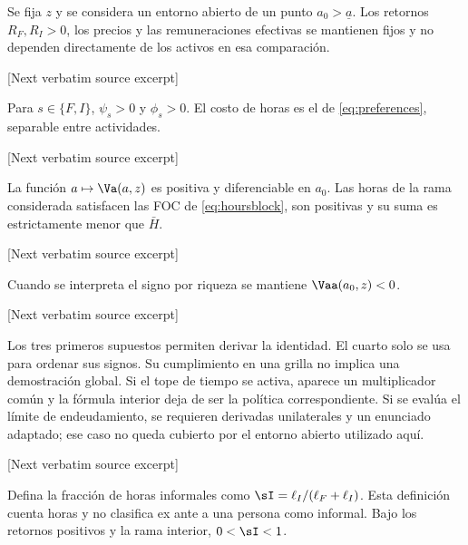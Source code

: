\documentclass[10pt]{article}
\begin{document}
\begin{ReviewVerbatim}

\begin{assumption}\label{ass:fixed}
Se fija \(z\) y se considera un entorno abierto de un punto \(a_0>\underline a\). Los retornos \(R_F,R_I>0\), los precios y las remuneraciones efectivas se mantienen fijos y no dependen directamente de los activos en esa comparación.
\end{assumption}

[Next verbatim source excerpt]

\begin{assumption}\label{ass:parameters}
Para \(s\in\{F,I\}\), \(\psi_s>0\) y \(\phi_s>0\). El costo de horas es el de \eqref{eq:preferences}, separable entre actividades.
\end{assumption}

[Next verbatim source excerpt]

\begin{assumption}\label{ass:regular}
La función \(a\mapsto\Va(a,z)\) es positiva y diferenciable en \(a_0\). Las horas de la rama considerada satisfacen las FOC de \eqref{eq:hoursblock}, son positivas y su suma es estrictamente menor que \(\bar H\).
\end{assumption}

[Next verbatim source excerpt]

\begin{assumption}\label{ass:concavity}
Cuando se interpreta el signo por riqueza se mantiene \(\Vaa(a_0,z)<0\).
\end{assumption}

[Next verbatim source excerpt]

Los tres primeros supuestos permiten derivar la identidad. El cuarto solo se usa para ordenar sus signos. Su cumplimiento en una grilla no implica una demostración global. Si el tope de tiempo se activa, aparece un multiplicador común y la fórmula interior deja de ser la política correspondiente. Si se evalúa el límite de endeudamiento, se requieren derivadas unilaterales y un enunciado adaptado; ese caso no queda cubierto por el entorno abierto utilizado aquí.

[Next verbatim source excerpt]

Defina la fracción de horas informales como
\(\sI=\ell_I/(\ell_F+\ell_I)\). Esta definición cuenta horas y no clasifica ex ante a una persona como informal. Bajo los retornos positivos y la rama interior, \(0<\sI<1\).
\end{ReviewVerbatim}
\end{document}
